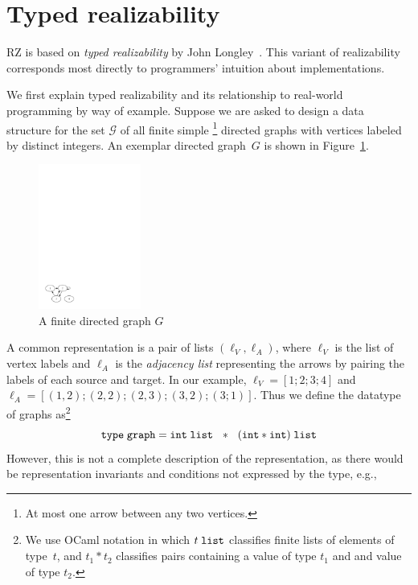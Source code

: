 \section{Typed realizability}
\label{sec:typed-realizability}

RZ is based on \emph{typed realizability} by John
Longley~\cite{Longley99}.   This variant of realizability corresponds most
directly to programmers' intuition about implementations.

We first explain typed realizability and its relationship to
real-world programming by way of example. Suppose we are asked to
design a data structure for the set $\mathcal{G}$ of all finite
simple%
\iflong
\footnote{At most one arrow between any two vertices.}
\fi %
directed graphs with vertices labeled by distinct integers. 
%
\iflong
An exemplar
directed graph~$G$ is shown in Figure~\ref{fig:digraph}.
%
\begin{figure}
  \centering
  \includegraphics[width=0.3\textwidth]{digraph}
  \caption{A finite directed graph $G$}
  \label{fig:digraph}
\end{figure}
\fi %
%
A common representation is a pair of lists $(\ell_V, \ell_A)$, where
$\ell_V$ is the list of vertex labels and $\ell_A$ is the \emph{adjacency list} 
representing the arrows by pairing the labels of each source and target.
\iflong
In our example,
$\ell_V = [1; 2;
3; 4]$ and $\ell_A = [(1,2); (2,2); (2,3); (3,2); (3;1)]$.
\fi %
%
 Thus we
define the datatype of graphs as\footnote{We use OCaml notation in
  which $t\;\mathtt{list}$ classifies finite lists of elements of type~$t$, and
  $t_1 * t_2$ classifies pairs containing a value of type $t_1$ and and 
  value of type $t_2$.}
%
\begin{equation*}
  \mathtt{type}\; \mathtt{graph} = \mathtt{int}\;\mathtt{list} \ \ * \ \ (\mathtt{int} * \mathtt{int})\;\mathtt{list}
\end{equation*}
%
However, this is not a complete description of the representation, as
there would be representation invariants and conditions not expressed by the type, e.g.,
